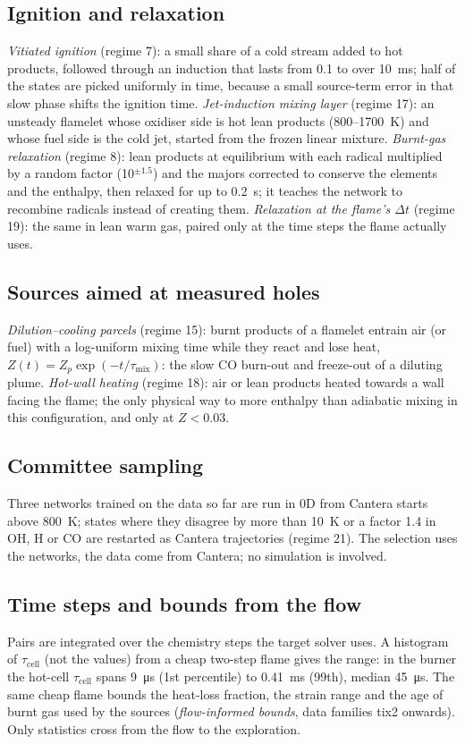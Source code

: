 \documentclass[preprint,review,12pt]{elsarticle}
\begin{document}
\subsection{Ignition and relaxation}
\emph{Vitiated ignition} (regime 7): a small share of a cold stream added to hot products, followed through an
induction that lasts from 0.1 to over 10~ms; half of the states are picked uniformly in time, because a small
source-term error in that slow phase shifts the ignition time. \emph{Jet-induction mixing layer} (regime 17): an
unsteady flamelet whose oxidiser side is hot lean products (800--1700~K) and whose fuel side is the cold jet,
started from the frozen linear mixture. \emph{Burnt-gas relaxation} (regime 8): lean products at equilibrium with
each radical multiplied by a random factor (10$^{\pm1.5}$) and the majors corrected to conserve the elements and the
enthalpy, then relaxed for up to 0.2~s; it teaches the network to recombine radicals instead of creating them.
\emph{Relaxation at the flame's $\Delta t$} (regime 19): the same in lean warm gas, paired only at the time steps the
flame actually uses.

\subsection{Sources aimed at measured holes}
\emph{Dilution--cooling parcels} (regime 15): burnt products of a flamelet entrain air (or fuel) with a log-uniform
mixing time while they react and lose heat, $Z(t)=Z_p\exp(-t/\tau_\mathrm{mix})$: the slow CO burn-out and freeze-out
of a diluting plume. \emph{Hot-wall heating} (regime 18): air or lean products heated towards a wall facing the
flame; the only physical way to more enthalpy than adiabatic mixing in this configuration, and only at $Z<0.03$.

\subsection{Committee sampling}
Three networks trained on the data so far are run in 0D from Cantera starts above 800~K; states where they disagree
by more than 10~K or a factor 1.4 in OH, H or CO are restarted as Cantera trajectories (regime 21). The selection uses
the networks, the data come from Cantera; no simulation is involved.

\subsection{Time steps and bounds from the flow}
Pairs are integrated over the chemistry steps the target solver uses. A histogram of $\tau_\mathrm{cell}$ (not the
values) from a cheap two-step flame gives the range: in the burner the hot-cell $\tau_\mathrm{cell}$ spans
\SI{9}{\micro s} (1st percentile) to 0.41~ms (99th), median \SI{45}{\micro s}. The same cheap flame bounds the heat-loss
fraction, the strain range and the age of burnt gas used by the sources (\emph{flow-informed bounds}, data families
tix2 onwards). Only statistics cross from the flow to the exploration.
\end{document}
